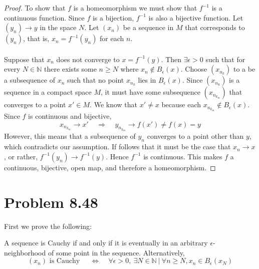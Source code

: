 \documentclass{article}
\theoremstyle{definition}
\begin{document}
    \begin{proof}
        To show that $f$ is a homeomorphism we must show that $f^{-1}$ is a continuous function.
        Since $f$ is a bijection, $f^{-1}$ is also a bijective function.
        Let $(y_n) \rightarrow y$ in the space $N$. Let $(x_n)$ be a sequence in $M$ that corresponds to $(y_n)$,
        that is, $x_n = f^{-1}(y_n)$ for each $n$. \\\\
        Suppose that $x_n$ does not converge to $x = f^{-1}(y)$.
        Then $\exists \epsilon > 0$ such that for every $N \in \mathbb{N}$ there exists some $n \geqslant N$ where $x_n \notin B_\epsilon(x)$.
        Choose $(x_{n_k})$ to a be a subsequence of $x_n$ such that no point $x_{n_k}$ lies in $B_\epsilon(x)$.
        Since $(x_{n_k})$ is a sequence in a compact space $M$, it must have some subsequence $(x_{n_{k_m}})$ that converges to a point $x' \in M$.
        We know that $x' \neq x$ because each $x_{n_{k_m}} \notin B_\epsilon(x)$. Since $f$ is continuous and bijective,
        \[
            x_{n_{k_m}} \rightarrow x' \ \ \ \ \ \Longrightarrow \ \ \ \ \ y_{n_{k_m}} \rightarrow f(x') \neq f(x) = y
        \]
        However, this means that a subsequence of $y_n$ converges to a point other than $y$, which contradicts our assumption.
        If follows that it must be the case that $x_n \rightarrow x$, or rather, $f^{-1}(y_n) \rightarrow f^{-1}(y)$. Hence $f^{-1}$
        is continuous. This makes $f$ a continuous, bijective, open map, and therefore a homeomorphism.
    \end{proof}

\section*{Problem 8.48}
    First we prove the following:
    
    \begin{mdframed}
        A sequence is Cauchy if and only if it is eventually in an arbitrary $\epsilon$-neighborhood of some 
        point in the sequence. Alternatively,
        \[
            (x_n) \text{ is Cauchy } \ \ \ \ \ \Longleftrightarrow \ \ \ \ \ \forall \epsilon > 0, \ \exists N \in \mathbb{N} \ | \ \forall n \geqslant N, x_n \in B_\epsilon(x_N)
        \]  
    \end{mdframed}
\end{document}
